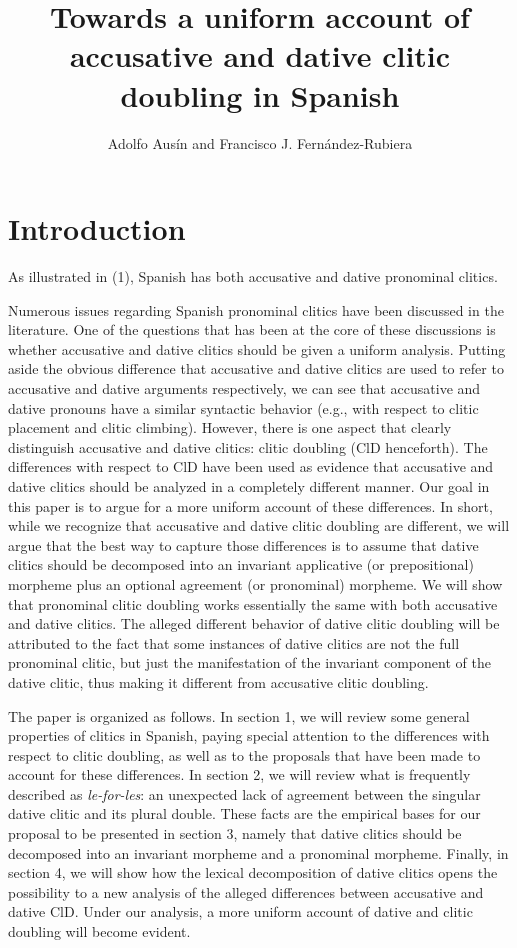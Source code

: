\documentclass[output=paper,colorlinks,citecolor=brown,
]{langscibook}
\author{Adolfo Ausín\affiliation{Michigan State University} and Francisco J. Fernández-Rubiera\affiliation{University of Central Florida}}
\title{Towards a uniform account of accusative and dative clitic doubling in Spanish}
\begin{document}
\maketitle

\section{Introduction}

As illustrated in (1), Spanish has both accusative and dative pronominal clitics. 




Numerous issues regarding Spanish pronominal clitics have been discussed in the literature. One of the questions that has been at the core of these discussions is whether accusative and dative clitics should be given a uniform analysis. Putting aside the obvious difference that accusative and dative clitics are used to refer to accusative and dative arguments respectively, we can see that accusative and dative pronouns have a similar syntactic behavior (e.g., with respect to clitic placement and clitic climbing). However, there is one aspect that clearly distinguish accusative and dative clitics: clitic doubling (ClD henceforth). The differences with respect to ClD have been used as evidence that accusative and dative clitics should be analyzed in a completely different manner. Our goal in this paper is to argue for a more uniform account of these differences. In short, while we recognize that accusative and dative clitic doubling are different, we will argue that the best way to capture those differences is to assume that dative clitics should be decomposed into an invariant applicative (or prepositional) morpheme plus an optional agreement (or pronominal) morpheme. We will show that pronominal clitic doubling works essentially the same with both accusative and dative clitics. The alleged different behavior of dative clitic doubling will be attributed to the fact that some instances of dative clitics are not the full pronominal clitic, but just the manifestation of the invariant component of the dative clitic, thus making it different from accusative clitic doubling.

The paper is organized as follows. In section 1, we will review some general properties of clitics in Spanish, paying special attention to the differences with respect to clitic doubling, as well as to the proposals that have been made to account for these differences. In section 2, we will review what is frequently described as \textit{le-for-les}: an unexpected lack of agreement between the singular dative clitic and its plural double. These facts are the empirical bases for our proposal to be presented in section 3, namely that dative clitics should be decomposed into an invariant morpheme and a pronominal morpheme. Finally, in section 4, we will show how the lexical decomposition of dative clitics opens the possibility to a new analysis of the alleged differences between accusative and dative ClD. Under our analysis, a more uniform account of dative and clitic doubling will become evident. 
\end{document}
